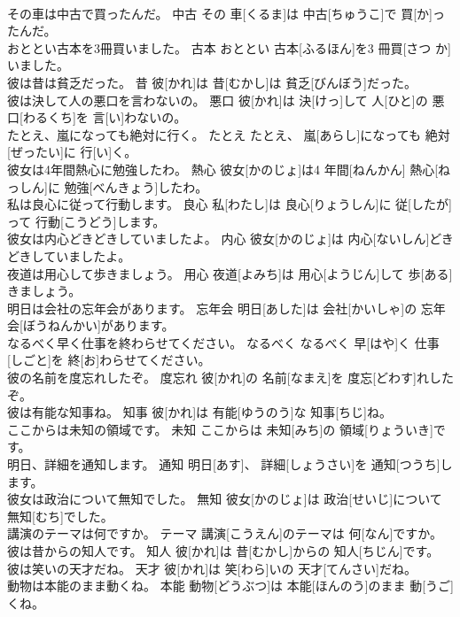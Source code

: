 \documentclass[8pt]{extreport}
\begin{document}
\begin{CJK}{UTF8}{min}
\\	その車は中古で買ったんだ。	中古	その 車[くるま]は 中古[ちゅうこ]で 買[か]ったんだ。	
\\	おととい古本を3冊買いました。	古本	おととい 古本[ふるほん]を3 冊買[さつ か]いました。	
\\	彼は昔は貧乏だった。	昔	彼[かれ]は 昔[むかし]は 貧乏[びんぼう]だった。	
\\	彼は決して人の悪口を言わないの。	悪口	彼[かれ]は 決[けっ]して 人[ひと]の 悪口[わるくち]を 言[い]わないの。	
\\	たとえ、嵐になっても絶対に行く。	たとえ	たとえ、 嵐[あらし]になっても 絶対[ぜったい]に 行[い]く。	
\\	彼女は4年間熱心に勉強したわ。	熱心	彼女[かのじょ]は4 年間[ねんかん] 熱心[ねっしん]に 勉強[べんきょう]したわ。	
\\	私は良心に従って行動します。	良心	私[わたし]は 良心[りょうしん]に 従[したが]って 行動[こうどう]します。	
\\	彼女は内心どきどきしていましたよ。	内心	彼女[かのじょ]は 内心[ないしん]どきどきしていましたよ。	
\\	夜道は用心して歩きましょう。	用心	夜道[よみち]は 用心[ようじん]して 歩[ある]きましょう。	
\\	明日は会社の忘年会があります。	忘年会	明日[あした]は 会社[かいしゃ]の 忘年会[ぼうねんかい]があります。	
\\	なるべく早く仕事を終わらせてください。	なるべく	なるべく 早[はや]く 仕事[しごと]を 終[お]わらせてください。	
\\	彼の名前を度忘れしたぞ。	度忘れ	彼[かれ]の 名前[なまえ]を 度忘[どわす]れしたぞ。	
\\	彼は有能な知事ね。	知事	彼[かれ]は 有能[ゆうのう]な 知事[ちじ]ね。	
\\	ここからは未知の領域です。	未知	ここからは 未知[みち]の 領域[りょういき]です。	
\\	明日、詳細を通知します。	通知	明日[あす]、 詳細[しょうさい]を 通知[つうち]します。	
\\	彼女は政治について無知でした。	無知	彼女[かのじょ]は 政治[せいじ]について 無知[むち]でした。	
\\	講演のテーマは何ですか。	テーマ	講演[こうえん]のテーマは 何[なん]ですか。	
\\	彼は昔からの知人です。	知人	彼[かれ]は 昔[むかし]からの 知人[ちじん]です。	
\\	彼は笑いの天才だね。	天才	彼[かれ]は 笑[わら]いの 天才[てんさい]だね。	
\\	動物は本能のまま動くね。	本能	動物[どうぶつ]は 本能[ほんのう]のまま 動[うご]くね。	

\end{CJK}
\end{document}
